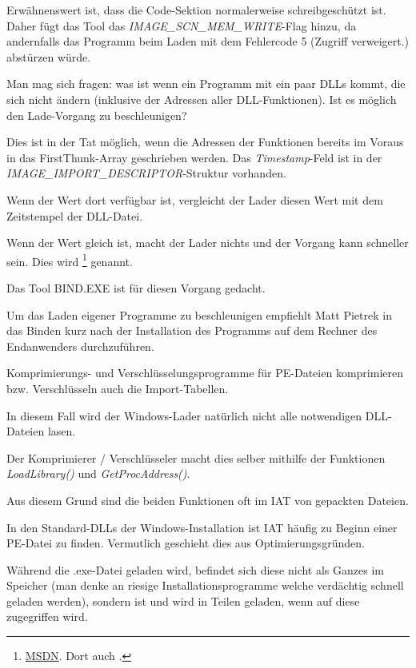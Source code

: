 Erwähnenswert ist, dass die Code-Sektion normalerweise schreibgeschützt ist.
Daher fügt das Tool das \emph{IMAGE\_SCN\_MEM\_WRITE}-Flag hinzu, da andernfalls
das Programm beim Laden mit dem Fehlercode 5 (Zugriff verweigert.) abstürzen
würde.

Man mag sich fragen: was ist wenn ein Programm mit ein paar DLLs kommt, die
sich nicht ändern (inklusive der Adressen aller DLL-Funktionen). Ist es möglich
den Lade-Vorgang zu beschleunigen?

Dies ist in der Tat möglich, wenn die Adressen der Funktionen bereits im Voraus
in das FirstThunk-Array geschrieben werden. Das \emph{Timestamp}-Feld ist in der
\emph{IMAGE\_IMPORT\_DESCRIPTOR}-Struktur vorhanden.

Wenn der Wert dort verfügbar ist, vergleicht der Lader diesen Wert mit dem
Zeitstempel der DLL-Datei.

Wenn der Wert gleich ist, macht der Lader nichts und der Vorgang kann schneller
sein. Dies wird \footnote{\href{http://go.yurichev.com/17050}{MSDN}. Dort auch .}
genannt.

Das Tool BIND.EXE ist für diesen Vorgang gedacht.

Um das Laden eigener Programme zu beschleunigen empfiehlt Matt Pietrek in \PietrekPEURL
das Binden kurz nach der Installation des Programms auf dem Rechner des Endanwenders
durchzuführen.

Komprimierungs- und Verschlüsselungsprogramme für PE-Dateien komprimieren bzw.
Verschlüsseln auch die Import-Tabellen.

In diesem Fall wird der Windows-Lader natürlich nicht alle notwendigen DLL-Dateien lasen.

Der Komprimierer / Verschlüsseler macht dies selber mithilfe der Funktionen
\emph{LoadLibrary()} und \emph{GetProcAddress()}.

Aus diesem Grund sind die beiden Funktionen oft im \ac{IAT} von gepackten Dateien.

In den Standard-DLLs der Windows-Installation ist \ac{IAT} häufig zu Beginn einer
PE-Datei zu finden. Vermutlich geschieht dies aus Optimierungsgründen.

Während die .exe-Datei geladen wird, befindet sich diese nicht als Ganzes im Speicher
(man denke an riesige Installationsprogramme welche verdächtig schnell geladen werden),
sondern ist  und wird in Teilen geladen, wenn auf diese zugegriffen wird.

